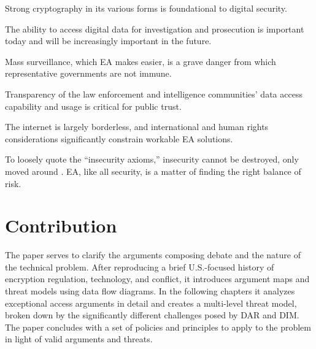 Strong cryptography in its various forms is foundational to digital security.

 The ability to access digital data for investigation and prosecution is important
today and will be increasingly important in the future.

 Mass surveillance, which \ac{EA} makes easier, is a grave danger from which
representative governments are not immune.

 Transparency of the law enforcement and intelligence communities' data access
capability and usage is critical for public trust.

 The internet is largely borderless, and international and human rights
considerations significantly constrain workable \ac{EA} solutions.

 To loosely quote the ``insecurity axioms,'' insecurity cannot be destroyed, only
moved around \cite{nrc_schneider_1999}. \Ac{EA}, like all security, is a matter of finding the right balance of risk.

\principlesend


\section{Contribution}
\label{sec-contribution}

The paper serves to clarify the arguments composing debate and the nature of the technical problem. After reproducing a
brief U.S.-focused history of encryption regulation, technology, and conflict, it introduces argument maps and threat
models using data flow diagrams. In the following chapters it analyzes exceptional access arguments in detail and
creates a multi-level threat model, broken down by the significantly different challenges posed by \ac{DAR} and
\ac{DIM}. The paper concludes with a set of policies and principles to apply to the problem in light of valid arguments
and threats.
